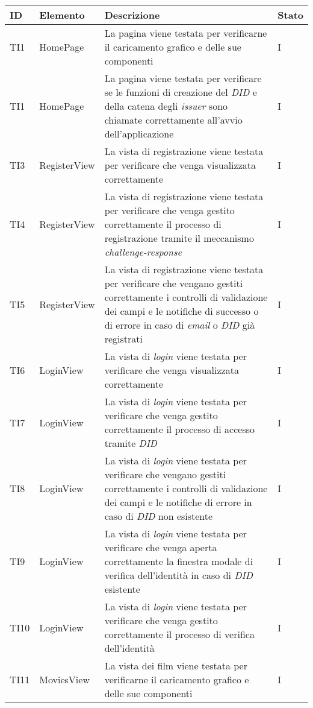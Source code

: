 \begin{center}
\label{tab:test-integrazione}
\begin{longtable}{|D{1.5cm}|D{3.0cm}|D{8.5cm}|D{1.5cm}|}
\hline
\textbf{ID} & \textbf{Elemento} & \textbf{Descrizione} & \textbf{Stato} \\
\hline
TI1 & HomePage & La pagina viene testata per verificarne il caricamento grafico e delle sue componenti & I \\
\hline
TI1 & HomePage & La pagina viene testata per verificare se le funzioni di creazione del \textit{DID} e della catena degli \textit{issuer} sono chiamate correttamente all'avvio dell'applicazione & I \\
\hline
\endhead
TI3 & RegisterView & La vista di registrazione viene testata per verificare che venga visualizzata correttamente & I \\
\hline
TI4 & RegisterView & La vista di registrazione viene testata per verificare che venga gestito correttamente il processo di registrazione tramite il meccanismo \textit{challenge-response} & I \\
\hline
TI5 & RegisterView & La vista di registrazione viene testata per verificare che vengano gestiti correttamente i controlli di validazione dei campi e le notifiche di successo o di errore in caso di \textit{email} o \textit{DID} già registrati & I \\
\hline
TI6 & LoginView & La vista di \textit{login} viene testata per verificare che venga visualizzata correttamente & I \\
\hline
TI7 & LoginView & La vista di \textit{login} viene testata per verificare che venga gestito correttamente il processo di accesso tramite \textit{DID} & I \\
\hline
TI8 & LoginView & La vista di \textit{login} viene testata per verificare che vengano gestiti correttamente i controlli di validazione dei campi e le notifiche di errore in caso di \textit{DID} non esistente & I \\
\hline
TI9 & LoginView & La vista di \textit{login} viene testata per verificare che venga aperta correttamente la finestra modale di verifica dell'identità in caso di \textit{DID} esistente & I \\
\hline
TI10 & LoginView & La vista di \textit{login} viene testata per verificare che venga gestito correttamente il processo di verifica dell'identità & I \\
\hline
TI11 & MoviesView & La vista dei film viene testata per verificarne il caricamento grafico e delle sue componenti & I \\

\end{longtable}
\end{center}
